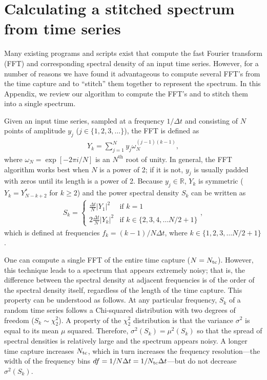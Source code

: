 \chapter{Calculating a stitched spectrum from time series}
\label{App:stitch_spec}

Many existing programs and scripts exist that compute the fast Fourier transform (FFT) and corresponding spectral density of an input time series. However, for a number of reasons we have found it advantageous to compute several FFT's from the time capture and to ``stitch'' them together to represent the spectrum. In this Appendix, we review our algorithm to compute the FFT's and to stitch them into a single spectrum.

Given an input time series, sampled at a frequency $1/\Delta t$ and consisting of $N$ points of amplitude $y_j$ ($j \in \{1, 2, 3, \ldots\}$), the FFT is defined as
\begin{align}\label{eqn:defFFT}
Y_k = \sum_{j=1}^N y_j \omega_N^{(j-1)(k-1)},
\end{align}
where $\omega_N = \exp[-2\pi i/N]$ is an $N^\text{th}$ root of unity. In general, the FFT algorithm works best when $N$ is a power of 2; if it is not, $y_j$ is usually padded with zeros until its length is a power of 2. Because $y_j \in \mathbb{R}$, $Y_k$ is symmetric ($Y_{k} = Y_{N-k+2}^*$ for $k \ge 2$) and the power spectral density $S_k$ can be written as
\begin{align}
S_k =
  \begin{cases}
   \frac{\Delta t}{N} |Y_1|^2 &\text{if } k = 1 \\
   2\frac{\Delta t}{N} |Y_k|^2 &\text{if } k \in \{2, 3, 4, \ldots N/2 + 1 \}
  \end{cases},
\end{align}
which is defined at frequencies $f_k = (k-1)/N \Delta t$, where $k \in \{1, 2, 3, \ldots N/2 + 1 \}$.

One can compute a single FFT of the entire time capture ($N = N_\text{tc}$). However, this technique leads to a spectrum that appears extremely noisy; that is, the difference between the spectral density at adjacent frequencies is of the order of the spectral density itself, regardless of the length of the time capture. This property can be understood as follows. At any particular frequency, $S_k$ of a random time series follows a Chi-squared distribution with two degrees of freedom ($S_k \sim \chi_2^2$). A property of the $\chi_2^2$ distribution is that the variance $\sigma^2$ is equal to its mean $\mu$ squared. Therefore, $\sigma^2(S_k) = \mu^2(S_k)$ so that the spread of spectral densities is relatively large and the spectrum appears noisy. A longer time capture increases $N_\text{tc}$, which in turn increases the frequency resolution---the width of the frequency bins $df = 1/N\Delta t = 1/N_\text{tc}\Delta t$---but do not decrease $\sigma^2(S_k)$.

